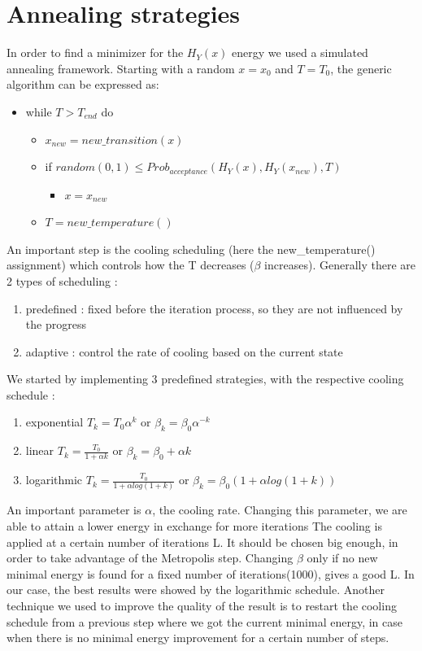 \documentclass{scrartcl}
\begin{document}
\section{Annealing strategies}
In order to find a minimizer for the $H_Y(x)$ energy we used a simulated annealing framework. Starting with a random $x = x_0$ and $T = T_0$, the generic algorithm can be expressed as: 
\begin{itemize}
    \item[] while $T > T_{end}$ do
    \begin{itemize}
        \item[] $x_{new} = new\_transition(x)$
        \item[] if $random(0, 1) \leq Prob_{acceptance}(H_Y(x), H_Y(x_{new}), T) $ 
        \begin{itemize}
            \item[] $x = x_{new}$
        \end{itemize}
        \item[] $T = new\_temperature()$
    \end{itemize}
\end{itemize}
An important step is the cooling scheduling (here the new\_temperature() assignment) which controls how the T decreases ($\beta$ increases). Generally there are 2 types of scheduling : 
\begin{enumerate}
    \item predefined : fixed before the iteration process, so they are not influenced by the progress
    \item adaptive : control the rate of cooling based on the current state
\end{enumerate}
We started by implementing 3 predefined strategies, with the respective cooling schedule : 
\begin{enumerate}
    \item exponential 
    $T_k = T_0 \alpha ^k$ or $\beta_k = \beta_0 \alpha^{-k} $
    \item linear
    $T_k = \frac{T_0}{1 + \alpha k}$ or $\beta_k = \beta_0 + \alpha k $
    \item logarithmic
    $T_k = \frac{T_0}{1 + \alpha log(1 + k)}$ or $\beta_k = \beta_0 (1 + \alpha log(1+k)) $
\end{enumerate}

An important parameter is $\alpha$, the cooling rate. Changing this parameter, we are able to attain a lower energy in exchange for more iterations The cooling is applied at a certain number of iterations L. It should be chosen big enough, in order to take advantage of the Metropolis step. Changing $\beta$ only if no new minimal energy is found for a fixed number of iterations(1000), gives a good L. In our case, the best results were showed by  the logarithmic schedule.
Another technique we used to improve the quality of the result is to restart the cooling schedule from a previous step where we got the current minimal energy, in case when there is no minimal energy improvement for a certain number of steps.
\end{document}
